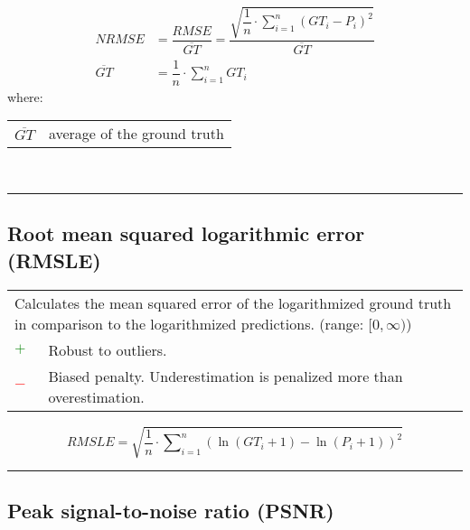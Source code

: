 \documentclass{article}
\makeatletter
\newenvironment{conditions}[1][where:]
	{\hspace{0.02\textwidth} #1 \begin{tabular}[t]{>{$}l<{$} @{${}={}$} l}}
	{\end{tabular}\\[\belowdisplayskip]}
\makeatother
\begin{document}
\begin{equation}
	\begin{aligned}
		\textit{NRMSE}         &= \dfrac{\textit{RMSE}}{\overline{\textit{GT}}} = \dfrac{\sqrt{\dfrac{1}{n} \cdot \sum\nolimits_{i = 1}^n (\textit{GT}_i - P_i)^2}}{\overline{\textit{GT}}} \\
		\overline{\textit{GT}} &= \dfrac{1}{n} \cdot \sum\nolimits_{i = 1}^n \textit{GT}_i
%
		\label{equation:NRMSE}
	\end{aligned}
\end{equation}
%
\begin{conditions}
	\overline{\textit{GT}} & average of the ground truth
\end{conditions}

\hrule


\subsection[Root mean squared logarithmic error (RMSLE)]{Root mean squared logarithmic error (RMSLE) \cite{nafees2021predictive}}

\begin{table}[H]\centering
	\begin{tabular}{m{}m{}}
		\multicolumn{2}{m{0.95\textwidth}}{Calculates the mean squared error of the logarithmized ground truth in comparison to the logarithmized predictions. (range: $[0, \infty)$)} \\
		\textcolor{Green}{$+$} & Robust to outliers. \\
		\textcolor{Red}{$-$}   & Biased penalty. Underestimation is penalized more than overestimation.
	\end{tabular}
\end{table}

\begin{equation}
	\textit{RMSLE} = \sqrt{\dfrac{1}{n} \cdot \sum\nolimits_{i = 1}^n (\ln(\textit{GT}_i + 1) - \ln(P_i + 1))^2}
%
	\label{equation:RMSLE}
\end{equation}

\hrule


\subsection[Peak signal-to-noise ratio (PSNR)]{Peak signal-to-noise ratio (PSNR) \cite{salomon2004data, huynh2008scope}}
\end{document}
